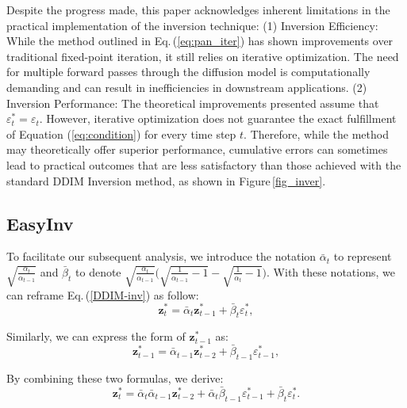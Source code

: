 \documentclass[letterpaper]{article} %
\begin{document}
Despite the progress made, this paper acknowledges inherent limitations in the practical implementation of the inversion technique:
%
(1) Inversion Efficiency: While the method outlined in Eq.\,(\ref{eq:pan_iter}) has shown improvements over traditional fixed-point iteration, it still relies on iterative optimization. The need for multiple forward passes through the diffusion model is computationally demanding and can result in inefficiencies in downstream applications.
%
(2) Inversion Performance: The theoretical improvements presented assume that \(\varepsilon^*_t = \varepsilon_t\). However, iterative optimization does not guarantee the exact fulfillment of Equation (\ref{eq:condition}) for every time step \( t \). Therefore, while the method may theoretically offer superior performance, cumulative errors can sometimes lead to practical outcomes that are less satisfactory than those achieved with the standard DDIM Inversion method, as shown in Figure\,\ref{fig_inver}.



\subsection{EasyInv}
\label{sec:ours}

To facilitate our subsequent analysis, we introduce the notation $\bar\alpha_{t}$ to represent $\sqrt{\frac{\alpha_{t}}{\alpha_{t-1}}}$ and $\bar\beta_{t}$ to denote $\sqrt{\frac{\alpha_{t}}{\alpha_{t-1}}}\Big(\sqrt{\frac{1}{\alpha_{t-1}} - 1} - \sqrt{\frac{1}{\alpha_t} - 1} \Big)$. With these notations, we can reframe Eq.\,(\ref{DDIM-inv}) as follow:
\begin{equation}\label{eq:x_t}
\mathbf{z}^*_{t}=\bar\alpha_{t}\mathbf{z}^*_{t-1} + \bar\beta_{t}\varepsilon^*_{t},
\end{equation}



Similarly, we can express the form of $\mathbf{z}^*_{t-1}$ as:
\begin{equation}\label{eq:x_t-1}
\mathbf{z}^*_{t-1}=\bar\alpha_{t-1}\mathbf{z}^*_{t-2} + \bar\beta_{t-1}\varepsilon^*_{t-1},
\end{equation}


By combining these two formulas, we derive:
\begin{equation}\label{eq:reformed_x_t}
\mathbf{z}^*_{t}=\bar\alpha_{t}\bar\alpha_{t-1}\mathbf{z}^*_{t-2} + \bar\alpha_{t}\bar\beta_{t-1}\varepsilon^*_{t-1} + \bar\beta_{t}\varepsilon^*_{t}.
\end{equation}
\end{document}
